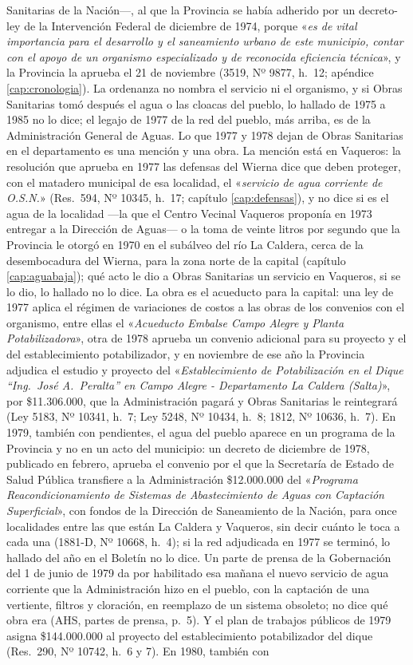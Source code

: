 Sanitarias de la Nación---, al que la Provincia se había adherido por un decreto-ley de la Intervención Federal de diciembre de 1974, porque «\textit{es de vital importancia para el desarrollo y el saneamiento urbano de este municipio, contar con el apoyo de un organismo especializado y de reconocida eficiencia técnica}», y la Provincia la aprueba el 21 de noviembre (3519, Nº 9877, h.\ 12; apéndice \ref{cap:cronologia}). La ordenanza no nombra el servicio ni el organismo, y si Obras Sanitarias tomó después el agua o las cloacas del pueblo, lo hallado de 1975 a 1985 no lo dice; el legajo de 1977 de la red del pueblo, más arriba, es de la Administración General de Aguas. Lo que 1977 y 1978 dejan de Obras Sanitarias en el departamento es una mención y una obra. La mención está en Vaqueros: la resolución que aprueba en 1977 las defensas del Wierna dice que deben proteger, con el matadero municipal de esa localidad, el «\textit{servicio de agua corriente de O.S.N.}» (Res.\ 594, Nº 10345, h.\ 17; capítulo \ref{cap:defensas}), y no dice si es el agua de la localidad ---la que el Centro Vecinal Vaqueros proponía en 1973 entregar a la Dirección de Aguas--- o la toma de veinte litros por segundo que la Provincia le otorgó en 1970 en el subálveo del río La Caldera, cerca de la desembocadura del Wierna, para la zona norte de la capital (capítulo \ref{cap:aguabaja}); qué acto le dio a Obras Sanitarias un servicio en Vaqueros, si se lo dio, lo hallado no lo dice. La obra es el acueducto para la capital: una ley de 1977 aplica el régimen de variaciones de costos a las obras de los convenios con el organismo, entre ellas el «\textit{Acueducto Embalse Campo Alegre y Planta Potabilizadora}», otra de 1978 aprueba un convenio adicional para su proyecto y el del establecimiento potabilizador, y en noviembre de ese año la Provincia adjudica el estudio y proyecto del «\textit{Establecimiento de Potabilización en el Dique ``Ing.\ José A.\ Peralta'' en Campo Alegre - Departamento La Caldera (Salta)}», por \$11.306.000, que la Administración pagará y Obras Sanitarias le reintegrará (Ley 5183, Nº 10341, h.\ 7; Ley 5248, Nº 10434, h.\ 8; 1812, Nº 10636, h.\ 7). En 1979, también con pendientes, el agua del pueblo aparece en un programa de la Provincia y no en un acto del municipio: un decreto de diciembre de 1978, publicado en febrero, aprueba el convenio por el que la Secretaría de Estado de Salud Pública transfiere a la Administración \$12.000.000 del «\textit{Programa Reacondicionamiento de Sistemas de Abastecimiento de Aguas con Captación Superficial}», con fondos de la Dirección de Saneamiento de la Nación, para once localidades entre las que están La Caldera y Vaqueros, sin decir cuánto le toca a cada una (1881-D, Nº 10668, h.\ 4); si la red adjudicada en 1977 se terminó, lo hallado del año en el Boletín no lo dice. Un parte de prensa de la Gobernación del 1 de junio de 1979 da por habilitado esa mañana el nuevo servicio de agua corriente que la Administración hizo en el pueblo, con la captación de una vertiente, filtros y cloración, en reemplazo de un sistema obsoleto; no dice qué obra era (AHS, partes de prensa, p.~5). Y el plan de trabajos públicos de 1979 asigna \$144.000.000 al proyecto del establecimiento potabilizador del dique (Res.\ 290, Nº 10742, h.\ 6 y 7). En 1980, también con 